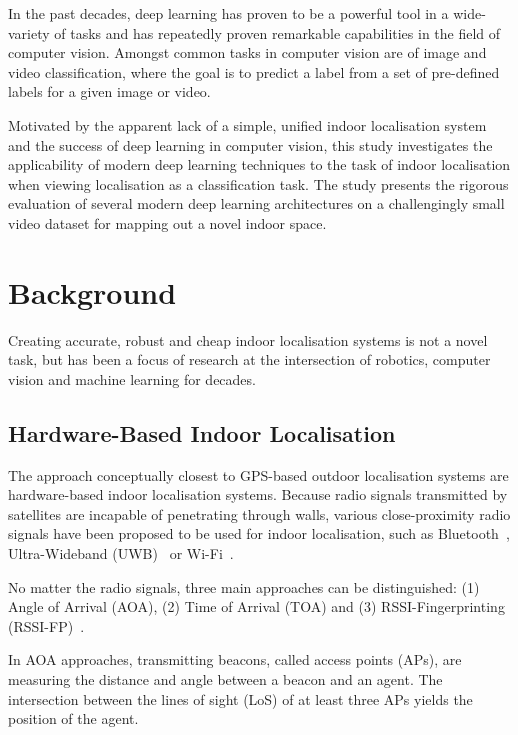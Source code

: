 \documentclass[a4paper]{article}
\begin{document}
In the past decades, deep learning has proven to be a powerful tool in a
wide-variety of tasks and has repeatedly proven remarkable capabilities in the
field of computer vision. Amongst common tasks in computer vision are of image
and video classification, where the goal is to predict a label from a set of
pre-defined labels for a given image or video.

Motivated by the apparent lack of a simple, unified indoor localisation system
and the success of deep learning in computer vision, this study investigates
the applicability of modern deep learning techniques to the task of indoor
localisation when viewing localisation as a classification task. The study
presents the rigorous evaluation of several modern deep learning architectures
on a challengingly small video dataset for mapping out a novel indoor space.


\section{Background} %
\label{sec:background}

Creating accurate, robust and cheap indoor localisation systems is not a novel
task, but has been a focus of research at the intersection of robotics,
computer vision and machine learning for decades.

\subsection{Hardware-Based Indoor Localisation} %
\label{sub:hardware-based-indoor-localisation}

The approach conceptually closest to GPS-based outdoor localisation systems
are hardware-based indoor localisation systems. Because radio signals
transmitted by satellites are incapable of penetrating through walls, various
close-proximity radio signals have been proposed to be used for indoor
localisation, such as Bluetooth~\cite{bluetooth1, bluetooth2}, Ultra-Wideband
(UWB)~\cite{uwb1, uwb2} or Wi-Fi~\cite{survey1, survey2}.

No matter the radio signals, three main approaches can be distinguished:
(1) Angle of Arrival (AOA), (2) Time of Arrival (TOA) and (3)
RSSI-Fingerprinting (RSSI-FP)~\cite{survey2}. 

In AOA approaches, transmitting beacons, called access points (APs), are
measuring the distance and angle between a beacon and an agent. The
intersection between the lines of sight (LoS) of at least three APs yields
the position of the agent. 
\end{document}
